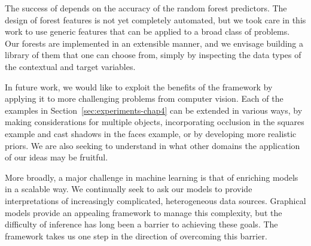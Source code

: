 The success of \MTD depends on the accuracy of the random forest predictors. The design of forest features is not yet completely automated, but we took care in this work to use generic features that can be applied to a broad class of problems. Our forests are implemented in an extensible manner, and we envisage building a library of them that one can choose from, simply by inspecting the data types of the contextual and target variables.

In future work, we would like to exploit the benefits of the \MTD framework by applying it to more challenging problems from computer vision. Each of the examples in Section~\ref{sec:experiments-chap4} can be extended in various ways, \eg by making considerations for multiple objects, incorporating occlusion in the squares example and cast shadows in the faces example, or by developing more realistic priors. We are also seeking to understand in what other domains the application of our ideas may be fruitful.

More broadly, a major challenge in machine learning is that of enriching models in a scalable way. We continually seek to ask our models to provide interpretations of increasingly complicated, heterogeneous data sources. Graphical models provide an appealing framework to manage this complexity, but the difficulty of inference has long been a barrier to achieving these goals. The \MTD framework takes us one step in the direction of overcoming this barrier.
